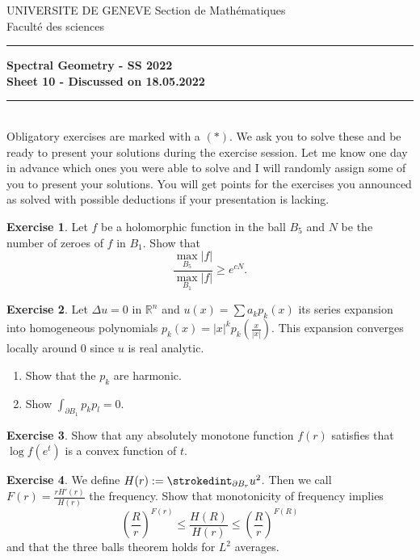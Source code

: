 \documentclass[a4paper,11pt]{article}
\theoremstyle{definition}
\newtheorem{exercise}{Exercise}
\begin{document}
\pagestyle{headings}
\noindent UNIVERSITE DE GENEVE \hfill Section de Mathématiques\\
\noindent Facult\'e des sciences \hfill \\[-3mm]
\hrule

\large

\begin{center}
\textbf{Spectral Geometry - SS 2022 \\ Sheet 10 - Discussed on 18.05.2022}
\end{center}
\hrule
\text{}\\[1cm]

Obligatory exercises are marked with a $(*)$. We ask you to solve these and be ready to present your solutions during the exercise session. Let me know one day in advance which ones you were able to solve and I will randomly assign some of you to present your solutions. You will get points for the exercises you announced as solved with possible deductions if your presentation is lacking.

\begin{exercise}
	Let $f$ be a holomorphic function in the ball $B_5$ and $N$ be the number of zeroes of $f$ in $B_1$.
	Show that 
	\[ \frac{\max_{B_5} |f|}{\max_{B_1} |f|} \geq e^{cN}.\]
\end{exercise}



\begin{exercise}
	Let $\Delta u = 0$ in $\mathbb{R}^n$ and $u(x) = \sum a_k p_k(x)$ its series expansion into homogeneous polynomials $p_k(x) = |x|^k p_k(\frac{x}{|x|})$. This expansion converges locally around $0$ since $u$ is real analytic.
	\begin{enumerate}
		\item Show that the $p_k$ are harmonic.
		\item Show $\int_{\partial B_1} p_k p_l = 0$.
	\end{enumerate}
\end{exercise}

\begin{exercise}
	Show that any absolutely monotone function $f(r)$ satisfies that $\log f(e^t)$ is a convex function of $t$.
\end{exercise}

\begin{exercise}
	We define $H(r) := \strokedint_{\partial B_r} u^2$. Then we call $F(r) = \frac{r H'(r)}{H(r)}$ the frequency. Show that monotonicity of frequency implies
	\[ \left(\frac{R}{r}\right)^{F(r)} \leq \frac{H(R)}{H(r)} \leq \left(\frac{R}{r}\right)^{F(R)} \]
	and that the three balls theorem holds for $L^2$ averages.
\end{exercise}
\end{document}
